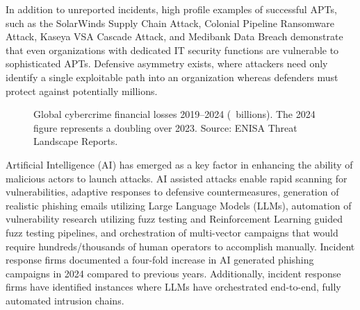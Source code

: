 In addition to unreported incidents, high profile examples of successful APTs, such as the SolarWinds Supply Chain Attack, Colonial Pipeline Ransomware Attack, Kaseya VSA Cascade Attack, and Medibank Data Breach demonstrate that even organizations with dedicated IT security functions are vulnerable to sophisticated APTs. Defensive asymmetry exists, where attackers need only identify a single exploitable path into an organization whereas defenders must protect against potentially millions.

\begin{figure}[H]
\centering
{}
\caption{Global cybercrime financial losses 2019--2024 (\texteuro~billions). The 2024 figure represents a doubling over 2023. Source: ENISA Threat Landscape Reports.}
\label{fig:cybercrime_losses}
\end{figure}
Artificial Intelligence (AI) has emerged as a key factor in enhancing the ability of malicious actors to launch attacks. AI assisted attacks enable rapid scanning for vulnerabilities, adaptive responses to defensive countermeasures, generation of realistic phishing emails utilizing Large Language Models (LLMs), automation of vulnerability research utilizing fuzz testing and Reinforcement Learning guided fuzz testing pipelines, and orchestration of multi-vector campaigns that would require hundreds/thousands of human operators to accomplish manually. Incident response firms documented a four-fold increase in AI generated phishing campaigns in 2024 compared to previous years. Additionally, incident response firms have identified instances where LLMs have orchestrated end-to-end, fully automated intrusion chains.

